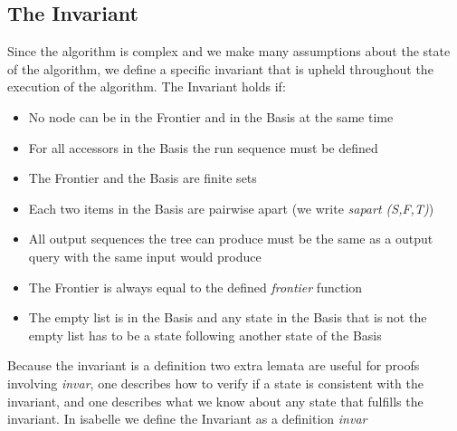 \subsection{The Invariant}
Since the algorithm is complex and we make many assumptions about the state of the algorithm, we define a specific invariant that is upheld throughout the execution of the algorithm. The Invariant holds if: 
\begin{itemize}
	\item No node can be in the Frontier and in the Basis at the same time
	\item For all accessors in the Basis the run sequence must be defined
	\item The Frontier and the Basis are finite sets
	\item Each two items in the Basis are pairwise apart (we write \textit{sapart (S,F,T)})
	\item All output sequences the tree can produce must be the same as a output query with the same input would produce
	\item The Frontier is always equal to the defined \textit{frontier} function 
	\item The empty list is in the Basis and any state in the Basis that is not the empty list has to be a state following another state of the Basis
\end{itemize}
Because the invariant is a definition two extra lemata are useful for proofs involving \textit{invar}, one describes how to verify if a state is consistent with the invariant, and one describes what we know about any state that fulfills the invariant.
In isabelle we define the Invariant as a definition \textit{invar}
\begin{myisabelle}
	\invar
\end{myisabelle}
